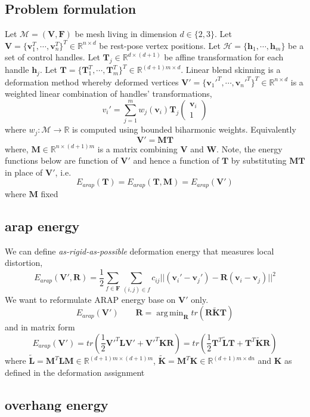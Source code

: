 \documentclass[12pt]{article}
\newcommand{\R}{\mathbb{R}}
\newcommand{\calM}{\mathcal{M}}
\newcommand{\calH}{\mathcal{H}}
\newcommand{\bL}{\mathbf{L}}
\newcommand{\bV}{\mathbf{V}}
\newcommand{\bF}{\mathbf{F}}
\newcommand{\bR}{\mathbf{R}}
\newcommand{\bW}{\mathbf{W}}
\newcommand{\bM}{\mathbf{M}}
\newcommand{\bT}{\mathbf{T}}
\newcommand{\bv}{\mathbf{v}}
\newcommand{\bh}{\mathbf{h}}
\newcommand{\bK}{\mathbf{K}}
\DeclareMathOperator*{\argmin}{arg\,min} %
\begin{document}
\subsection*{Problem formulation}

Let $\calM = (\bV, \bF)$ be mesh living in dimension $d\in \{2,3\}$. Let $\bV = \{\bv_1^T, \cdots, \bv_n^T\}^T \in \R^{n \times d}$ be rest-pose vertex positions. Let $\calH = \{ \bh_1, \cdots, \bh_m \}$ be a set of control handles. Let $\bT_j \in \R^{d \times (d+1)}$ be affine transformation for each handle $\bh_j$. Let $\bT = \{ \bT_1^T, \cdots, \bT_m^T \}^T \in \R^{(d+1)m \times d}$. Linear blend skinning is a deformation method whereby deformed vertices $\bV' = \{ \bv_1'^T, \cdots, \bv_n'^T \}^T \in \R^{n\times d}$ is a weighted linear combination of handles' transformations,
\[
    v_i' = \sum_{j=1}^m w_j(\bv_i) \bT_j 
    \begin{pmatrix} 
    \bv_i \\
    1
    \end{pmatrix} 
\]
where $w_j: \calM \rightarrow \R$ is computed using bounded biharmonic weights. Equivalently
\[
    \bV' = \bM \bT
\]
where,  $\bM \in \R^{n \times (d+1)m}$ is a matrix combining $\bV$ and $\bW$. Note, the energy functions below are function of $\bV'$ and hence a function of $\bT$ by substituting $\bM \bT$ in place of $\bV'$, i.e. 
\[
    E_{arap}(\bT) = E_{arap}(\bT, \bM) = E_{arap}(\bV')
\]
where $\bM$ fixed

\subsection*{arap energy}

We can define \textit{as-rigid-as-possible} deformation energy that measures local distortion,
\[
    E_{arap}(\bV', \bR) = \frac{1}{2} \sum_{f\in \bF} \sum_{(i,j)\in f} c_{ij} || (\bv_i' - \bv_j') - \bR(\bv_i - \bv_j) ||^2
\]
We want to reformulate ARAP energy base on $\bV'$ only.
\[
    E_{arap}(\bV')
    \qquad
    \bR = \argmin_{\bR} tr(\bR\tilde{\bK}\bT)
\]
and in matrix form
\[
    E_{arap}(\bV') 
    = tr(\frac{1}{2}\bV'^T \bL \bV' + \bV'^T \bK \bR )
    = tr(\frac{1}{2}\bT^T \tilde{\bL} \bT + \bT^T \tilde{\bK} \bR)
\]
where $\tilde{\bL} = \bM^T \bL \bM \in \R^{(d+1)m \times (d+1)m}$, $\tilde{\bK} = \bM^T \bK \in \R^{(d+1)m \times dn}$ and $\bK$ as defined in the deformation assignment

\subsection*{overhang energy}
\end{document}
